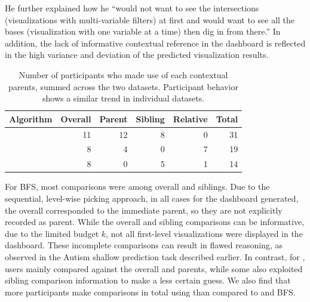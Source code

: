 He further explained how he ``would not want to see the intersections (visualizations with multi-variable filters) at first and would want to see all the bases (visualization with one variable at a time) then dig in from there.'' In addition, the lack of informative contextual reference in the \cluster dashboard is reflected in the high variance and deviation of the predicted visualization results.
\begin{table}[h!]\label{table:contextual_reference_count}
\centering
	\begin{tabular}{l|rrrr|r}
	\hline
	 Algorithm   &   Overall &   Parent &   Sibling &   Relative &   Total \\
	\hline
	 \system     &        11 &       12 &         8 &          0 &      31 \\
	 \cluster     &         8 &        4 &         0 &          7 &      19 \\
	 \BFS         &         8 &        0 &         5 &          1 &      14 \\
	\hline
	\end{tabular}
\caption{Number of participants who made use of each contextual parents, summed across the two datasets. Participant behavior shows a similar trend in individual datasets.}
\vspace{-10pt}
\end{table}
\par For BFS, most comparisons were among overall and siblings. Due to the sequential, level-wise picking approach, in all cases for the \BFS dashboard generated, the overall corresponded to the immediate parent, so they are not explicitly recorded as parent. While the overall and sibling comparisons can be informative, due to the limited budget $k$, not all first-level visualizations were displayed in the dashboard. These incomplete comparisons can result in flawed reasoning, as observed in the Autism shallow prediction task described earlier. In contrast, for \system, users mainly compared against the overall and parents, while some also exploited sibling comparison information to make a less certain guess. We also find that more participants make comparisons in total using \system than compared to \cluster and BFS.


